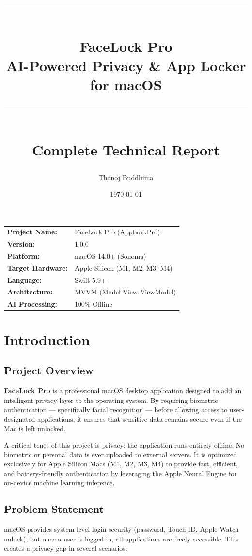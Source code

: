 \documentclass[12pt,a4paper]{report}
\title{
    \vspace{-1cm}
    \rule{\linewidth}{0.5mm} \\[0.4cm]
    {\Huge \textbf{FaceLock Pro}} \\[0.3cm]
    {\Large AI-Powered Privacy \& App Locker for macOS} \\[0.2cm]
    \rule{\linewidth}{0.5mm} \\[1cm]
    {\large Complete Technical Report}
}
\author{Thanoj Buddhima}
\date{\today}
\begin{document}
\maketitle
\thispagestyle{empty}

\vfill
\begin{center}
\begin{tabular}{ll}
    \textbf{Project Name:}     & FaceLock Pro (AppLockPro) \\
    \textbf{Version:}          & 1.0.0 \\
    \textbf{Platform:}         & macOS 14.0+ (Sonoma) \\
    \textbf{Target Hardware:}  & Apple Silicon (M1, M2, M3, M4) \\
    \textbf{Language:}         & Swift 5.9+ \\
    \textbf{Architecture:}     & MVVM (Model-View-ViewModel) \\
    \textbf{AI Processing:}    & 100\% Offline \\
\end{tabular}
\end{center}
\vfill

\newpage
\tableofcontents
\newpage

\chapter{Introduction}

\section{Project Overview}
\textbf{FaceLock Pro} is a professional macOS desktop application designed to add an intelligent privacy layer to the operating system. By requiring biometric authentication --- specifically facial recognition --- before allowing access to user-designated applications, it ensures that sensitive data remains secure even if the Mac is left unlocked.

A critical tenet of this project is privacy: the application runs entirely offline. No biometric or personal data is ever uploaded to external servers. It is optimized exclusively for Apple Silicon Macs (M1, M2, M3, M4) to provide fast, efficient, and battery-friendly authentication by leveraging the Apple Neural Engine for on-device machine learning inference.

\section{Problem Statement}
macOS provides system-level login security (password, Touch ID, Apple Watch unlock), but once a user is logged in, all applications are freely accessible. This creates a privacy gap in several scenarios:
\end{document}
